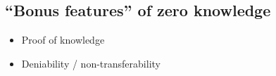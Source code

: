 \subsection{``Bonus features'' of zero
knowledge}\label{13-Bonus-features-of-zero}

\begin{itemize}
\item
  Proof of knowledge
\item
  Deniability / non-transferability
\end{itemize}
